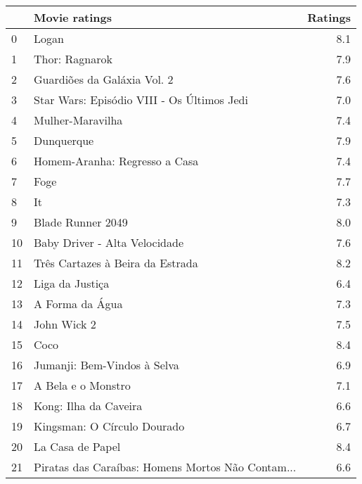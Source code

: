 \begin{tabular}{llr}
\toprule
{} &                                      Movie ratings &  Ratings \\
\midrule
0  &                                              Logan &      8.1 \\
1  &                                     Thor: Ragnarok &      7.9 \\
2  &                        Guardiões da Galáxia Vol. 2 &      7.6 \\
3  &         Star Wars: Episódio VIII - Os Últimos Jedi &      7.0 \\
4  &                                   Mulher-Maravilha &      7.4 \\
5  &                                         Dunquerque &      7.9 \\
6  &                      Homem-Aranha: Regresso a Casa &      7.4 \\
7  &                                               Foge &      7.7 \\
8  &                                                 It &      7.3 \\
9  &                                  Blade Runner 2049 &      8.0 \\
10 &                      Baby Driver - Alta Velocidade &      7.6 \\
11 &                   Três Cartazes à Beira da Estrada &      8.2 \\
12 &                                    Liga da Justiça &      6.4 \\
13 &                                    A Forma da Água &      7.3 \\
14 &                                        John Wick 2 &      7.5 \\
15 &                                               Coco &      8.4 \\
16 &                        Jumanji: Bem-Vindos à Selva &      6.9 \\
17 &                                 A Bela e o Monstro &      7.1 \\
18 &                              Kong: Ilha da Caveira &      6.6 \\
19 &                        Kingsman: O Círculo Dourado &      6.7 \\
20 &                                   La Casa de Papel &      8.4 \\
21 &  Piratas das Caraíbas: Homens Mortos Não Contam... &      6.6 \\

\end{tabular}
